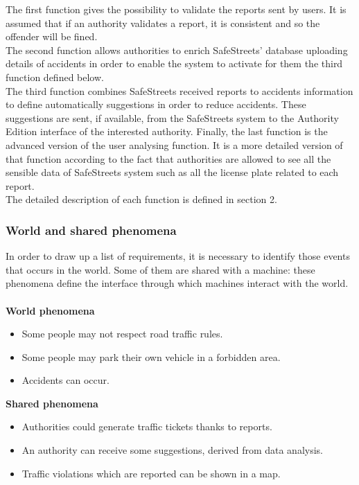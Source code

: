 \documentclass{article}
\begin{document}
    	    The first function gives the possibility to validate the reports sent by users. It is assumed that if an authority validates a report, it is consistent and so the offender will be fined.\\
    	    The second function allows authorities to enrich SafeStreets' database uploading details of accidents in order to enable the system to activate for them the third function defined below.\\
    	    The third function combines SafeStreets received reports to accidents information to define automatically suggestions in order to reduce accidents. These suggestions are sent, if available, from the SafeStreets system to the Authority Edition interface of the interested authority.
    	    Finally, the last function is the advanced version of the user analysing function. It is a more detailed version of that function according to the fact that authorities are allowed to see all the sensible data of SafeStreets system such as all the license plate related to each report.\\
    		The detailed description of each function is defined in section 2.
    	    
			\subsubsection{World and shared phenomena}
				In order to draw up a list of requirements, it is necessary to identify those events that occurs in the world. Some of them are shared with a machine: these phenomena define the interface through which machines interact with the world.\\\\				
				\textbf{World phenomena}
				\begin{itemize}
					\item Some people may not respect road traffic rules.
					\item Some people may park their own vehicle in a forbidden area.
					\item Accidents can occur.
				\end{itemize}
				\textbf{Shared phenomena}
				\begin{itemize}
					\item Authorities could generate traffic tickets thanks to reports. 
					\item An authority can receive some suggestions, derived from data analysis.
					\item Traffic violations which are reported can be shown in a map.
				\end{itemize}
\end{document}
